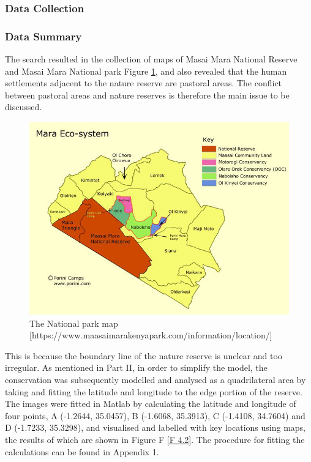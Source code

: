 \documentclass{mcmthesis}
\numberwithin{figure}{section}
\numberwithin{table}{section}
\numberwithin{equation}{section}
\begin{document}
\subsubsection{Data Collection}


\subsubsection{Data Summary}

 The search resulted in the collection of maps of Masai Mara National Reserve and Masai Mara National park Figure \ref{F 4.1}, and also revealed that the human settlements adjacent to the nature reserve are pastoral areas. The conflict between pastoral areas and nature reserves is therefore the main issue to be discussed.  
\begin{figure}
	\centering
	\includegraphics[width=0.5\linewidth]{"figures/F4.1 National park map"}
	\caption{The National park map [https://www.maasaimarakenyapark.com/information/location/]}
	\label{F 4.1}
\end{figure}


 This is because the boundary line of the nature reserve is unclear and too irregular. As mentioned in Part II, in order to simplify the model, the conservation was subsequently modelled and analysed as a quadrilateral area by taking and fitting the latitude and longitude to the edge portion of the reserve. The images were fitted in Matlab by calculating the latitude and longitude of four points, A (-1.2644, 35.0457), B (-1.6068, 35.3913), C (-1.4108, 34.7604) and D (-1.7233, 35.3298), and visualised and labelled with key locations using maps, the results of which are shown in Figure F \ref{F 4.2}. The procedure for fitting the calculations can be found in Appendix 1.
 
\end{document}
